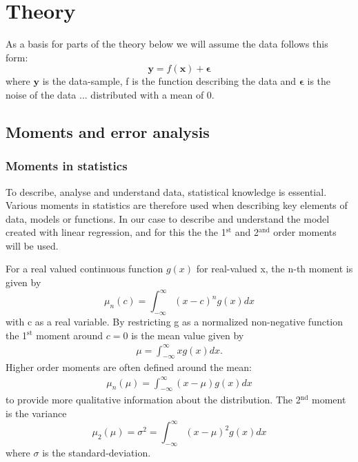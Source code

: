 \documentclass[uio,jmp,amsmath,amssymb,reprint,nofootinbib]{revtex4-1}
\numberwithin{equation}{section}
\newcommand{\infint}{\int_{-\infty}^\infty}
\begin{document}


\section{Theory}\label{sec:Theory}

As a basis for parts of the theory below we will assume the data follows this form:
\begin{equation}\label{eq:01}
    \bm{y} = f(\bm{x}) + \bm{\epsilon}
\end{equation}
where \(\bm{y}\) is the data-sample, f is the function describing the data and \(\bm{\epsilon}\) is the noise of the data ... distributed with a mean of 0.

\subsection{Moments and error analysis}

\subsubsection{Moments in statistics}

To describe, analyse and understand data, statistical knowledge is essential. Various moments in statistics are therefore used when describing key elements of data, models or functions. In our case to describe and understand the model created with linear regression, and for this the the 1\(^\text{st}\) and 2\(^\text{and}\) order moments will be used.

For a real valued continuous function \(g(x)\) for real-valued x, the n-th moment is given by
\begin{equation}
    \mu_n(c) = \infint (x-c)^ng(x)dx
\end{equation}
with c as a real variable. By restricting g as a normalized non-negative function the 1\(^\text{st}\) moment around \(c=0\) is the mean value given by
\begin{align}
    \mu = \infint xg(x)dx.
\end{align}
Higher order moments are often defined around the mean:
\begin{align}
    \mu_n(\mu) = \infint (x-\mu)g(x)dx
\end{align}
to provide more qualitative information about the distribution. The 2\(^\text{nd}\) moment is the variance
\begin{equation}
    \mu_2(\mu) = \sigma^2 = \infint (x-\mu)^2g(x)dx
\end{equation}
where \(\sigma\) is the standard-deviation.
\end{document}
